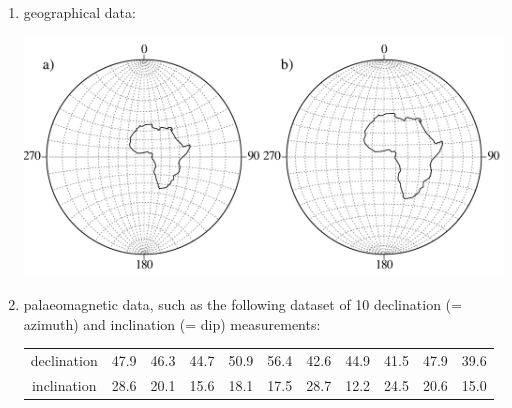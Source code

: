 \begin{enumerate}

\item geographical data:

\noindent\begin{minipage}[t][][b]{.6\linewidth}
\includegraphics[width=\textwidth]{../figures/Africa.pdf}\medskip
\end{minipage}
\begin{minipage}[t][][t]{.4\linewidth}
  \label{fig:Africa}
\end{minipage}

\item palaeomagnetic data, such as the following dataset of 10
  declination (= azimuth) and inclination (= dip) measurements:

\begin{tabular}{c|cccccccccc}
declination & 47.9 & 46.3 & 44.7 & 50.9 & 56.4 & 42.6 & 44.9 & 41.5 & 47.9 & 39.6 \\
inclination & 28.6 & 20.1 & 15.6 & 18.1 & 17.5 & 28.7 & 12.2 & 24.5 & 20.6 & 15.0 \\
\end{tabular}


\end{enumerate}
